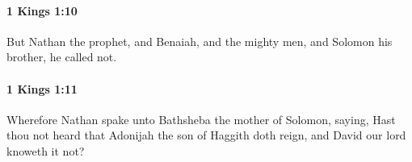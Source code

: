 		\paragraph{1 Kings 1:10} %
			\label{1KINGS-1-10}

			But Nathan the prophet, and Benaiah, and the mighty men, and Solomon his brother, he called not.


		\paragraph{1 Kings 1:11} %
			\label{1KINGS-1-11}

			Wherefore Nathan spake unto Bathsheba the mother of Solomon, saying, Hast thou not heard that Adonijah the son of Haggith doth reign, and David our lord knoweth it not?


